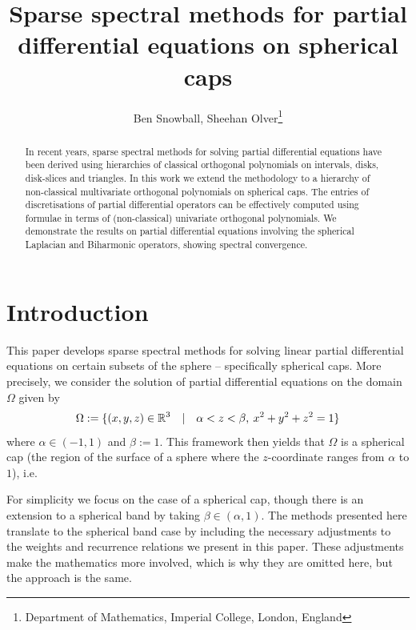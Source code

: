 \documentclass[11pt, oneside]{article}   	%
\title{Sparse spectral methods for partial differential equations on spherical caps}
\author{Ben Snowball, Sheehan Olver\thanks{Department of Mathematics, Imperial College, London, England}}
\begin{document}
\maketitle

\begin{abstract}
In recent years, sparse spectral methods for solving partial differential equations have been derived using hierarchies of classical orthogonal polynomials on intervals, disks, disk-slices and triangles. In this work we extend the methodology to a hierarchy of non-classical multivariate orthogonal polynomials on spherical caps. The entries of discretisations of partial differential operators can be effectively computed using formulae in terms of (non-classical) univariate orthogonal polynomials. We demonstrate the results on partial differential equations involving the spherical Laplacian and Biharmonic operators, showing spectral convergence. 
\end{abstract}


%
\section{Introduction}

This paper develops sparse spectral methods for solving linear partial differential equations on certain subsets of the sphere -- specifically spherical caps. More precisely, we consider the solution of partial differential equations on the domain $\Omega$ given by
\begin{align*}
	\Omega := \{(x,y,z) \in \mathbb{R}^3 \quad | \quad \alpha < z < \beta, \: x^2 + y^2 + z^2 = 1\}
\end{align*}
where $\alpha \in (-1,1)$ and $\beta := 1$.
This framework then yields that $\Omega$ is a spherical cap (the region of the surface of a sphere where the $z$-coordinate ranges from $\alpha$ to $1$), i.e.

\begin{remark}
For simplicity we focus on the case of a spherical cap, though there is an extension to a spherical band by taking $\beta \in (\alpha,1)$. The methods presented here translate to the spherical band case by including the necessary adjustments to the weights and recurrence relations we present in this paper. These adjustments make the mathematics more involved, which is why they are omitted here, but the approach is the same.
\end{remark}
\end{document}
